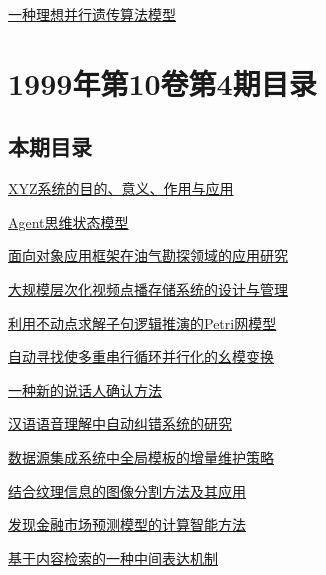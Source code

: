 \documentclass[a4paper]{article}
\begin{document}
\href{http://www.jos.org.cn/ch/reader/download_pdf.aspx?file_no=19990519&year_id=1999&quarter_id=5&falg=1}{一种理想并行遗传算法模型}


\section{\textbf{1999年第10卷第4期目录}}
\subsection{本期目录}
\href{http://www.jos.org.cn/ch/reader/download_pdf.aspx?file_no=19990401&year_id=1999&quarter_id=4&falg=1}{XYZ系统的目的、意义、作用与应用}

\href{http://www.jos.org.cn/ch/reader/download_pdf.aspx?file_no=19990402&year_id=1999&quarter_id=4&falg=1}{Agent思维状态模型}

\href{http://www.jos.org.cn/ch/reader/download_pdf.aspx?file_no=19990403&year_id=1999&quarter_id=4&falg=1}{面向对象应用框架在油气勘探领域的应用研究}

\href{http://www.jos.org.cn/ch/reader/download_pdf.aspx?file_no=19990404&year_id=1999&quarter_id=4&falg=1}{大规模层次化视频点播存储系统的设计与管理}

\href{http://www.jos.org.cn/ch/reader/download_pdf.aspx?file_no=19990405&year_id=1999&quarter_id=4&falg=1}{利用不动点求解子句逻辑推演的Petri网模型}

\href{http://www.jos.org.cn/ch/reader/download_pdf.aspx?file_no=19990406&year_id=1999&quarter_id=4&falg=1}{自动寻找使多重串行循环并行化的幺模变换}

\href{http://www.jos.org.cn/ch/reader/download_pdf.aspx?file_no=19990407&year_id=1999&quarter_id=4&falg=1}{一种新的说话人确认方法}

\href{http://www.jos.org.cn/ch/reader/download_pdf.aspx?file_no=19990408&year_id=1999&quarter_id=4&falg=1}{汉语语音理解中自动纠错系统的研究}

\href{http://www.jos.org.cn/ch/reader/download_pdf.aspx?file_no=19990409&year_id=1999&quarter_id=4&falg=1}{数据源集成系统中全局模板的增量维护策略}

\href{http://www.jos.org.cn/ch/reader/download_pdf.aspx?file_no=19990410&year_id=1999&quarter_id=4&falg=1}{结合纹理信息的图像分割方法及其应用}

\href{http://www.jos.org.cn/ch/reader/download_pdf.aspx?file_no=19990411&year_id=1999&quarter_id=4&falg=1}{发现金融市场预测模型的计算智能方法}

\href{http://www.jos.org.cn/ch/reader/download_pdf.aspx?file_no=19990412&year_id=1999&quarter_id=4&falg=1}{基于内容检索的一种中间表达机制}
\end{document}

